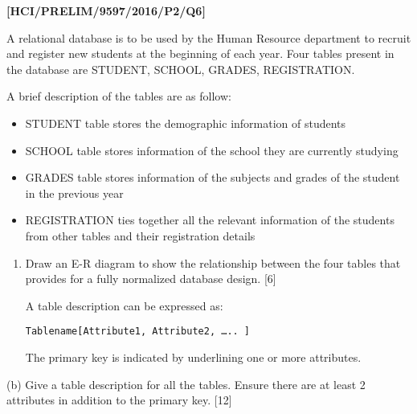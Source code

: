 \item \textbf{{[}HCI/PRELIM/9597/2016/P2/Q6{]} }

A relational database is to be used by the Human Resource department
to recruit and register new students at the beginning of each year.
Four tables present in the database are STUDENT, SCHOOL, GRADES, REGISTRATION. 

A brief description of the tables are as follow: 
\begin{itemize}
\item STUDENT table stores the demographic information of students
\item SCHOOL table stores information of the school they are currently studying
\item GRADES table stores information of the subjects and grades of the
student in the previous year
\item REGISTRATION ties together all the relevant information of the students
from other tables and their registration details
\end{itemize}
\begin{enumerate}
\item Draw an E-R diagram to show the relationship between the four tables
that provides for a fully normalized database design. \hfill{} {[}6{]}

A table description can be expressed as: 

\texttt{Tablename{[}Attribute1, Attribute2, \dots .. {]} }

The primary key is indicated by underlining one or more attributes. 
\end{enumerate}
(b) Give a table description for all the tables. Ensure there are
at least 2 attributes in addition to the primary key.\hfill{} {[}12{]}